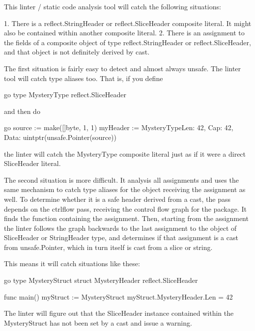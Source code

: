 
This linter / static code analysis tool will catch the following situations:

 1. There is a reflect.StringHeader or reflect.SliceHeader composite literal. It might also be contained within
    another composite literal.
 2. There is an assignment to the fields of a composite object of type reflect.StringHeader or reflect.SliceHeader,
    and that object is not definitely derived by cast.

The first situation is fairly easy to detect and almost always unsafe. The linter tool will catch type aliases too. That
is, if you define

go
type MysteryType reflect.SliceHeader


and then do

go
source := make([]byte, 1, 1)
myHeader := MysteryTypeLen: 42, Cap: 42, Data: uintptr(unsafe.Pointer(source))


the linter will catch the MysteryType composite literal just as if it were a direct SliceHeader literal.

The second situation is more difficult. It analysis all assignments and uses the same mechanism to catch type aliases
for the object receiving the assignment as well. To determine whether it is a safe header derived from a cast, the pass
depends on the ctrlflow pass, receiving the control flow graph for the package. It finds the function containing the
assignment. Then, starting from the assignment the linter follows the graph backwards to the last assignment to the
object of SliceHeader or StringHeader type, and determines if that assignment is a cast from unsafe.Pointer, which
in turn itself is cast from a slice or string.

This means it will catch situations like these:

go
type MysteryStruct struct 
    MysteryHeader reflect.SliceHeader


func main() 
    myStruct := MysteryStruct
    myStruct.MysteryHeader.Len = 42



The linter will figure out that the SliceHeader instance contained within the MysteryStruct has not been set by a
cast and issue a warning.



